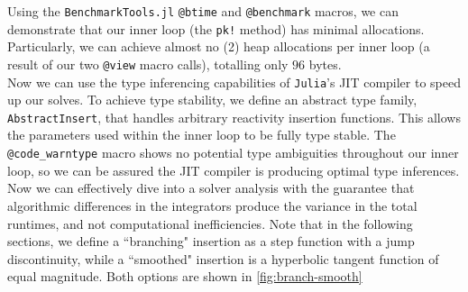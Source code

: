 \documentclass[review,onefignum,onetabnum]{siamart171218}
\begin{document}
Using the \texttt{BenchmarkTools.jl} \texttt{@btime} and \texttt{@benchmark} macros,
we can demonstrate that our inner loop (the \texttt{pk!} method) has minimal allocations.
Particularly, we can achieve almost no (2) heap allocations per inner loop (a result of
our two \texttt{@view} macro calls), totalling only $96$ bytes. \\

Now we can use the type inferencing capabilities of \texttt{Julia}'s JIT compiler
to speed up our solves. To achieve type stability, we define an abstract type family,
\texttt{AbstractInsert}, that handles arbitrary reactivity insertion functions.
This allows the parameters used within the inner loop to be fully type stable.
The \texttt{@code\_warntype} macro shows no potential type
ambiguities throughout our inner loop, so we can be assured the JIT compiler is
producing optimal type inferences. \\

%

Now we can effectively dive into a solver analysis with the guarantee that algorithmic
differences in the integrators produce the variance in the total runtimes, and not
computational inefficiencies. Note that in the following sections, we define a
``branching" insertion as a step function with a jump discontinuity, while a
``smoothed" insertion is a hyperbolic tangent function of equal magnitude. Both
options are shown in \cref{fig:branch-smooth}
\end{document}
